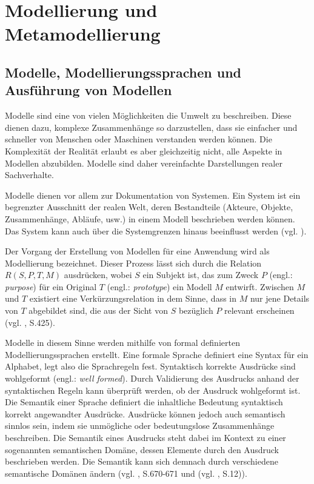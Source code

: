 \chapter{Modellierung und Metamodellierung}\label{mod-mod}

\section{Modelle, Modellierungssprachen und Ausführung von Modellen}\label{mod-modell}
Modelle sind eine von vielen Möglichkeiten die Umwelt zu beschreiben. Diese dienen dazu, komplexe Zusammenhänge so darzustellen, dass sie einfacher und schneller von Menschen oder Maschinen verstanden werden können. Die Komplexität der Realität erlaubt es aber gleichzeitig nicht, alle Aspekte in Modellen abzubilden. Modelle sind daher vereinfachte Darstellungen realer Sachverhalte.

Modelle dienen vor allem zur Dokumentation von Systemen. Ein System ist ein begrenzter Ausschnitt der realen Welt, deren Bestandteile (Akteure, Objekte, Zusammenhänge, Abläufe, usw.) in einem Modell beschrieben werden können. Das System kann auch über die Systemgrenzen hinaus beeinflusst werden (vgl. \citep{BernroiderStix2006}).

Der Vorgang der Erstellung von Modellen für eine Anwendung wird als Modellierung bezeichnet. Dieser Prozess lässt sich durch die Relation $R(S,P,T,M)$ ausdrücken, wobei $S$ ein Subjekt ist, das zum Zweck $P$ (engl.: \emph{purpose}) für ein Original $T$ (engl.: \emph{prototype}) ein Modell $M$ entwirft. Zwischen $M$ und $T$ existiert eine Verkürzungsrelation in dem Sinne, dass in $M$ nur jene Details von $T$ abgebildet sind, die aus der Sicht von $S$ bezüglich $P$ relevant erscheinen (vgl. \citep{ClausSchwill2006}, S.425).

Modelle in diesem Sinne werden mithilfe von formal definierten Modellierungssprachen erstellt. Eine formale Sprache definiert eine Syntax für ein Alphabet, legt also die Sprachregeln fest.
Syntaktisch korrekte Ausdrücke sind wohlgeformt (engl.: \emph{well formed}).
Durch Validierung des Ausdrucks anhand der syntaktischen Regeln kann überprüft werden, ob der Ausdruck wohlgeformt ist.
Die Semantik einer Sprache definiert die inhaltliche Bedeutung syntaktisch korrekt angewandter Ausdrücke.
Ausdrücke können jedoch auch semantisch sinnlos sein, indem sie unmögliche oder bedeutungslose Zusammenhänge beschreiben.
Die Semantik eines Ausdrucks steht dabei im Kontext zu einer sogenannten semantischen Domäne, dessen Elemente durch den Ausdruck beschrieben werden. Die Semantik kann sich demnach durch verschiedene semantische Domänen ändern (vgl. \citep{ClausSchwill2006}, S.670-671 und (vgl. \citep{OMG2008}, S.12)).

